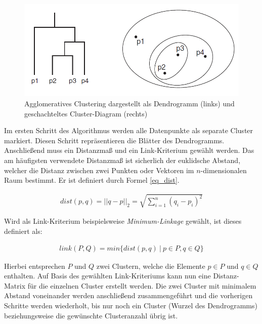 \begin{figure}[H]
    \centering
    \includegraphics[width=0.7\linewidth]{resources/img/grundlagen/agglo_clustering}
    \caption[Darstellung Funktionsweise Agglomeratives Clustering]
            {Agglomeratives Clustering dargestellt als Dendrogramm (links) und geschachteltes Cluster-Diagram (rechts) \cite[]{tan2007introduction}}
    \label{fig:grund_agglo_clustering}
\end{figure}

Im ersten Schritt des Algorithmus werden alle Datenpunkte als separate Cluster markiert. Diesen Schritt
repräsentieren die Blätter des Dendrogramms.
Anschließend muss ein Distanzmaß und ein Link-Kriterium gewählt werden.
Das am häufigsten verwendete Distanzmaß ist sicherlich der euklidsche Abstand, welcher die Distanz zwischen zwei Punkten
oder Vektoren im $n$-dimensionalen Raum bestimmt. Er ist definiert durch Formel \ref{eq_dist}.

\begin{ceqn}
\begin{align}
\label{eq_dist}
    dist(p,q) = ||q-p||_2 = \sqrt{\sum_{i=1}^n (q_i-p_i)^2}
\end{align}
\end{ceqn}

Wird als Link-Kriterium beispielsweise \textit{Minimum-Linkage} gewählt, ist dieses definiert als:

\begin{ceqn}
\begin{align}
\label{eq_linkage}
    link(P, Q) = min\{ dist(p,q)\ |\ p \in P, q \in Q\}
\end{align}
\end{ceqn}

Hierbei entsprechen $P$ und $Q$ zwei Clustern, welche die Elemente $p \in P$ und $q \in Q$ enthalten.
Auf Basis des gewählten Link-Kriteriums kann nun eine Distanz-Matrix für die einzelnen Cluster
erstellt werden.
Die zwei Cluster mit minimalem Abstand voneinander werden anschließend zusammengeführt und die
vorherigen Schritte werden wiederholt, bis nur noch ein Cluster (Wurzel des Dendrogramms) beziehungsweise
die gewünschte Clusteranzahl übrig ist. \cite[]{GeorgeSeif2018, tan2007introduction}

